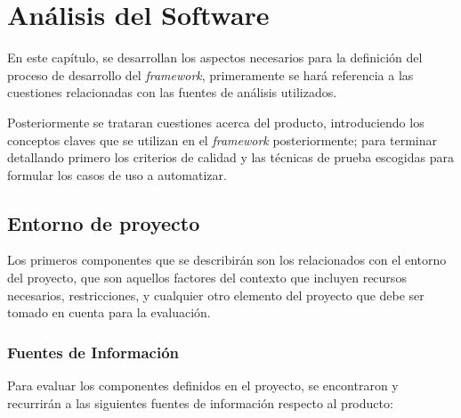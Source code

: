 \chapter{Análisis del Software}

En este capítulo, se desarrollan los aspectos necesarios para la definición del
proceso de desarrollo del \emph{framework}, primeramente se hará referencia a
las cuestiones relacionadas con las fuentes de análisis utilizados.

Posteriormente se trataran cuestiones acerca del producto, introduciendo los
conceptos claves que se utilizan en el \emph{framework} posteriormente; para
terminar detallando primero los criterios de calidad y las técnicas de prueba
escogidas para formular los casos de uso a automatizar.

\section{Entorno de proyecto}
Los primeros componentes que se describirán son los relacionados con el entorno
del proyecto, que son aquellos factores del contexto que incluyen recursos
necesarios, restricciones, y cualquier otro elemento del proyecto que debe ser
tomado en cuenta para la evaluación.

\subsection{Fuentes de Información}
Para evaluar los componentes definidos en el proyecto, se encontraron
y recurrirán a las siguientes fuentes de información respecto al producto:

